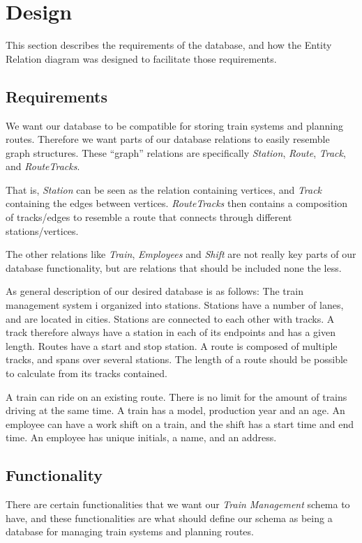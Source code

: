 \section{Design} \label{sec:design}

This section describes the requirements of the database, and how the Entity 
Relation diagram was designed to facilitate those requirements. 

\subsection{Requirements}

We want our database to be compatible for storing train systems and planning 
routes. Therefore we want parts of our database relations to easily resemble 
graph structures. These ``graph'' relations are specifically \emph{Station}, 
\emph{Route}, \emph{Track}, and \emph{RouteTracks}.

That is, \emph{Station} can be seen as the relation containing vertices, and 
\emph{Track} containing the edges between vertices. \emph{RouteTracks} then 
contains a composition of tracks/edges to resemble a route that connects 
through different stations/vertices.

The other relations like \emph{Train}, \emph{Employees} and \emph{Shift} are 
not really key parts of our database functionality, but are relations that 
should be included none the less.

As general description of our desired database is as follows:
The train management system i organized into stations. Stations have a number 
of lanes, and are located in cities. Stations are connected to each other with 
tracks. A track therefore always have a station in each of its endpoints and 
has a given length. Routes have a start and stop station. A route is composed 
of multiple tracks, and spans over several stations. The length of a route 
should be possible to calculate from its tracks contained.

A train can ride on an existing route. There is no limit for the amount of trains driving at the same time. A train has a model, production year and an age. An employee can have a work shift on a train, and the shift has a start time and end time. An employee has unique initials, a name, and an address.

\subsection{Functionality}
There are certain functionalities that we want our \emph{Train Management} 
schema to have, and these functionalities are what should define our schema as 
being a database for managing train systems and planning routes.

